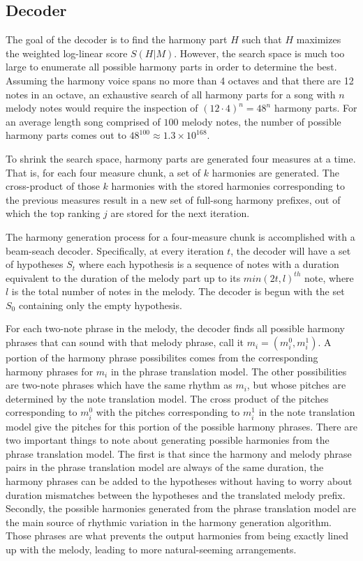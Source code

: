 \documentclass{sig-alternate}
\begin{document}
\subsection {Decoder}
The goal of the decoder is to find the harmony part $H$ such that $H$ maximizes the weighted log-linear score $S(H | M)$. However, the search space is much too large to enumerate all possible harmony parts in order to determine the best. Assuming the harmony voice spans no more than 4 octaves and that there are 12 notes in an octave, an exhaustive search of all harmony parts for a song with $n$ melody notes would require the inspection of $(12\cdot 4)^{n} = 48^{n}$ harmony parts. For an average length song comprised of $100$ melody notes, the number of possible harmony parts comes out to $48^{100} \approx 1.3\times10^{168}$. 

To shrink the search space, harmony parts are generated four measures at a time. That is, for each four measure chunk, a set of $k$ harmonies are generated. The cross-product of those $k$ harmonies with the stored harmonies corresponding to the previous measures result in a new set of full-song harmony prefixes, out of which the top ranking $j$ are stored for the next iteration.

The harmony generation process for a four-measure chunk is accomplished with a beam-seach decoder. Specifically, at every iteration $t$, the decoder will have a set of hypotheses $S_{t}$ where each hypothesis is a sequence of notes with a duration equivalent to the duration of the melody part up to its $min(2t, l)^{th}$ note, where $l$ is the total number of notes in the melody. The decoder is begun with the set $S_{0}$ containing only the empty hypothesis. 

For each two-note phrase in the melody, the decoder finds all possible harmony phrases that can sound with that melody phrase, call it $m_{i} = (m_{i}^{0}, m_{i}^{1})$. A portion of the harmony phrase possibilites comes from the corresponding harmony phrases for $m_{i}$ in the phrase translation model. The other possibilities are two-note phrases which have the same rhythm as $m_{i}$, but whose pitches are determined by the note translation model. The cross product of the pitches corresponding to $m_{i}^{0}$ with the pitches corresponding to $m_{i}^{1}$ in the note translation model give the pitches for this portion of the possible harmony phrases. There are two important things to note about generating possible harmonies from the phrase translation model. The first is that since the harmony and melody phrase pairs in the phrase translation model are always of the same duration, the harmony phrases can be added to the hypotheses without having to worry about duration mismatches between the hypotheses and the translated melody prefix. Secondly, the possible harmonies generated from the phrase translation model are the main source of rhythmic variation in the harmony generation algorithm. Those phrases are what prevents the output harmonies from being exactly lined up with the melody, leading to more natural-seeming arrangements.
\end{document}
